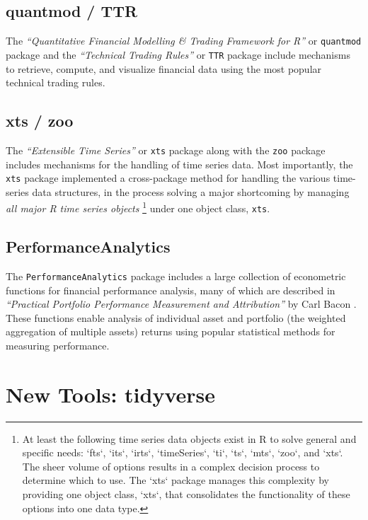 \subsection{quantmod / TTR}\label{quantmod-ttr}

The \emph{``Quantitative Financial Modelling \& Trading Framework for
R''} or \texttt{quantmod} package and the \emph{``Technical Trading
Rules''} or \texttt{TTR} package include mechanisms to retrieve,
compute, and visualize financial data using the most popular technical
trading rules.

\subsection{xts / zoo}\label{xts-zoo}

The \emph{``Extensible Time Series''} or \texttt{xts} package along with
the \texttt{zoo} package includes mechanisms for the handling of time
series data. Most importantly, the \texttt{xts} package implemented a
cross-package method for handling the various time-series data
structures, in the process solving a major shortcoming by managing
\emph{all major R time series objects}
\footnote{At least the following time series data objects exist in R to solve general and specific needs: `fts`, `its`, `irts`, `timeSeries`, `ti`, `ts`, `mts`, `zoo`, and `xts`. The sheer volume of options results in a complex decision process to determine which to use. The `xts` package manages this complexity by providing one object class, `xts`, that consolidates the functionality of these options into one data type.}
under one object class, \texttt{xts}.

\subsection{PerformanceAnalytics}\label{performanceanalytics}

The \texttt{PerformanceAnalytics} package includes a large collection of
econometric functions for financial performance analysis, many of which
are described in \emph{``Practical Portfolio Performance Measurement and
Attribution''} by Carl Bacon \citep{Bacon2004} . These functions enable
analysis of individual asset and portfolio (the weighted aggregation of
multiple assets) returns using popular statistical methods for measuring
performance.

\section{New Tools: tidyverse}\label{new-tools-tidyverse}

